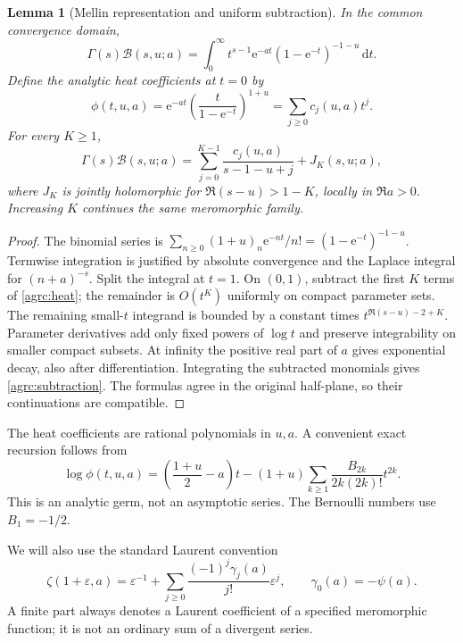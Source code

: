\documentclass[11pt]{article}
\numberwithin{equation}{section}
\newtheorem{lemma}[theorem]{Lemma}
\theoremstyle{definition}\newtheorem{definition}[theorem]{Definition}
\theoremstyle{remark}\newtheorem{remark}[theorem]{Remark}
\newcommand{\Bcal}{\mathcal B}
\newcommand{\dd}{\,\mathrm d}
\newcommand{\e}{\mathrm e}
\begin{document}
\begin{lemma}[Mellin representation and uniform subtraction]
\label{agrc:mellin}
In the common convergence domain,
\begin{equation}\label{agrc:mellin-eq}
 \Gamma(s)\Bcal(s,u;a)
 =\int_0^\infty t^{s-1}\e^{-at}(1-\e^{-t})^{-1-u}\dd t.
\end{equation}
Define the analytic heat coefficients at $t=0$ by
\begin{equation}\label{agrc:heat}
 \phi(t,u,a)=\e^{-at}\left(\frac{t}{1-\e^{-t}}\right)^{1+u}
       =\sum_{j\geq0}c_j(u,a)t^j.
\end{equation}
For every $K\geq1$,
\begin{equation}\label{agrc:subtraction}
 \Gamma(s)\Bcal(s,u;a)
  =\sum_{j=0}^{K-1}\frac{c_j(u,a)}{s-1-u+j}+J_K(s,u;a),
\end{equation}
where $J_K$ is jointly holomorphic for $\Re(s-u)>1-K$, locally in
$\Re a>0$. Increasing $K$ continues the same meromorphic family.
\end{lemma}
\begin{proof}
The binomial series is
$\sum_{n\geq0}(1+u)_n\e^{-nt}/n!=(1-\e^{-t})^{-1-u}$.
Termwise integration is justified by absolute convergence and the
Laplace integral for $(n+a)^{-s}$. Split the integral at $t=1$.
On $(0,1)$, subtract the first $K$ terms of \eqref{agrc:heat}; the
remainder is $O(t^K)$ uniformly on compact parameter sets.
The remaining small-$t$ integrand is bounded by a constant times
$t^{\Re(s-u)-2+K}$. Parameter derivatives add only fixed powers of
$\log t$ and preserve integrability on smaller compact subsets.
At infinity the positive real part of $a$ gives exponential decay,
also after differentiation. Integrating the subtracted monomials gives
\eqref{agrc:subtraction}. The formulas agree in the original half-plane,
so their continuations are compatible.
\end{proof}

The heat coefficients are rational polynomials in $u,a$. A convenient
exact recursion follows from
\begin{equation}\label{agrc:heat-log}
 \log\phi(t,u,a)=\left(\frac{1+u}{2}-a\right)t
 -(1+u)\sum_{k\geq1}\frac{B_{2k}}{2k(2k)!}t^{2k}.
\end{equation}
This is an analytic germ, not an asymptotic series. The Bernoulli
numbers use $B_1=-1/2$.

We will also use the standard Laurent convention
\begin{equation}\label{agrc:Stieltjes}
 \zeta(1+\varepsilon,a)=\varepsilon^{-1}
 +\sum_{j\geq0}\frac{(-1)^j\gamma_j(a)}{j!}\varepsilon^j,
 \qquad \gamma_0(a)=-\psi(a).
\end{equation}
A finite part always denotes a Laurent coefficient of a specified
meromorphic function; it is not an ordinary sum of a divergent series.
\end{document}
